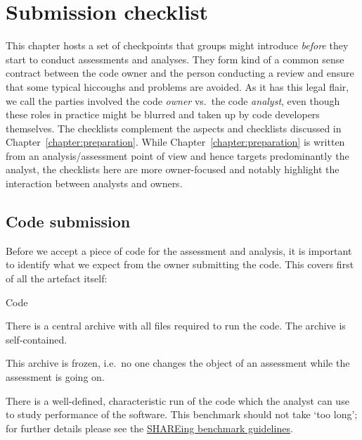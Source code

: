 \chapter{Submission checklist}
\label{appendix:submission-checklist}

This chapter hosts a set of checkpoints that groups might introduce \emph{before} they start to conduct assessments and analyses.
They form kind of a common sense contract between the code owner and the person conducting a review and ensure that some typical hiccoughs and problems are avoided.
As it has this legal flair, we call the parties involved the code \emph{owner} vs.~the code \emph{analyst}, even though these roles in practice might be blurred and taken up by code developers themselves. 
The checklists complement the aspects and checklists discussed in Chapter~\ref{chapter:preparation}.
While Chapter~\ref{chapter:preparation} is written from an analysis/assessment point of view and hence targets predominantly the analyst, 
the checklists here are more owner-focused and notably highlight the interaction between analysts and owners.


\section{Code submission}

Before we accept a piece of code for the assessment and analysis, it is important to identify what we expect from the owner submitting the code.
This covers first of all the artefact itself:

\begin{checklisttitled}{Code}
 \item There is a central archive with all files required to run the code. The archive is self-contained.
 \item This archive is frozen, i.e.~no one changes the object of an assessment while the assessment is going on.
 \item There is a well-defined, characteristic run of the code which the analyst can use to study performance of the software. This benchmark should not take `too long'; for further details please see the \href{https://shareing-dri.github.io/assets/pdfs/shareing-benchmark-guide.pdf}{SHAREing benchmark guidelines}.
\end{checklisttitled}

